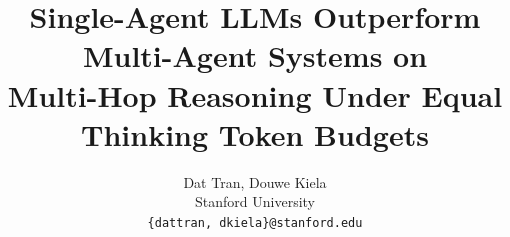 \documentclass{article} %
\title{Single-Agent LLMs Outperform Multi-Agent Systems on\\ Multi-Hop Reasoning Under Equal Thinking Token Budgets}
\author{Dat Tran, Douwe Kiela\\
Stanford University\\
\texttt{\{dattran, dkiela\}@stanford.edu} \\
}
\begin{document}
\ifcolmsubmission
\linenumbers
\fi

\maketitle

\begin{abstract}

\end{abstract}
\end{document}
